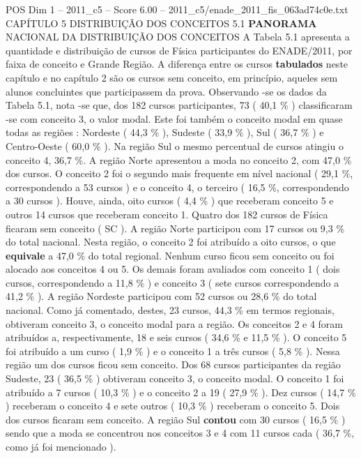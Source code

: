 \begin{textsample}{POS Dim 1 – 2011\_c5 – Score 6.00 – 2011\_c5/enade\_2011\_fis\_063ad74c0e.txt}  \label{ex:f1_pos_129}
CAPÍTULO 5 DISTRIBUIÇÃO DOS CONCEITOS 5.1 \textbf{PANORAMA} NACIONAL DA DISTRIBUIÇÃO DOS CONCEITOS A Tabela 5.1 apresenta a quantidade e distribuição de cursos de Física participantes do ENADE/2011, por faixa de conceito e Grande Região.
A diferença entre os cursos \textbf{tabulados} neste capítulo e no capítulo 2 são os cursos sem conceito, em princípio, aqueles sem alunos concluintes que participassem da prova.
Observando -se os dados da Tabela 5.1, nota -se que, dos 182 cursos participantes, 73 ( 40,1 \% ) classificaram -se com conceito 3, o valor modal.
Este foi também o conceito modal em quase todas as regiões : Nordeste ( 44,3 \% ), Sudeste ( 33,9 \% ), Sul ( 36,7 \% ) e Centro-Oeste ( 60,0 \% ).
Na região Sul o mesmo percentual de cursos atingiu o conceito 4, 36,7 \%.
A região Norte apresentou a moda no conceito 2, com 47,0 \% dos cursos.
O conceito 2 foi o segundo mais frequente em nível nacional ( 29,1 \%, correspondendo a 53 cursos ) e o conceito 4, o terceiro ( 16,5 \%, correspondendo a 30 cursos ).
Houve, ainda, oito cursos ( 4,4 \% ) que receberam conceito 5 e outros 14 cursos que receberam conceito 1.
Quatro dos 182 cursos de Física ficaram sem conceito ( SC ).
A região Norte participou com 17 cursos ou 9,3 \% do total nacional.
Nesta região, o conceito 2 foi atribuído a oito cursos, o que \textbf{equivale} a 47,0 \% do total regional.
Nenhum curso ficou sem conceito ou foi alocado aos conceitos 4 ou 5.
Os demais foram avaliados com conceito 1 ( dois cursos, correspondendo a 11,8 \% ) e conceito 3 ( sete cursos correspondendo a 41,2 \% ).
A região Nordeste participou com 52 cursos ou 28,6 \% do total nacional.
Como já comentado, destes, 23 cursos, 44,3 \% em termos regionais, obtiveram conceito 3, o conceito modal para a região.
Os conceitos 2 e 4 foram atribuídos a, respectivamente, 18 e seis cursos ( 34,6 \% e 11,5 \% ).
O conceito 5 foi atribuído a um curso ( 1,9 \% ) e o conceito 1 a três cursos ( 5,8 \% ).
Nessa região um dos cursos ficou sem conceito.
Dos 68 cursos participantes da região Sudeste, 23 ( 36,5 \% ) obtiveram conceito 3, o conceito modal.
O conceito 1 foi atribuído a 7 cursos ( 10,3 \% ) e o conceito 2 a 19 ( 27,9 \% ).
Dez cursos ( 14,7 \% ) receberam o conceito 4 e sete outros ( 10,3 \% ) receberam o conceito 5.
Dois dos cursos ficaram sem conceito.
A região Sul \textbf{contou} com 30 cursos ( 16,5 \% ) sendo que a moda se concentrou nos conceitos 3 e 4 com 11 cursos cada ( 36,7 \%, como já foi mencionado ).

\end{textsample}
